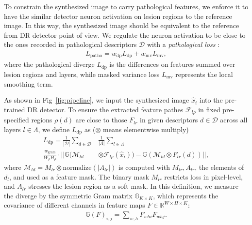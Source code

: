 \documentclass[letterpaper]{article} %
\begin{document}
   To constrain the synthesized image to carry pathological features, we enforce it to have the similar detector neuron activation on lesion regions to the reference image. In this way, the synthesized image should be equivalent to the reference from DR detector point of view. We regulate the neuron activation to be close to the ones recorded in pathological descriptors $ \mathcal{D} $ with a  \emph{pathological loss} :
    \begin{align}
	\label{align_patho_loss} 
	L_\mathrm{patho} = w_\mathrm{dp} L_\mathrm{dp} + w_\mathrm{mv} L_\mathrm{mv},
	\end{align}
	where the pathological diverge $L_\mathrm{dp}$ is the differences on features summed over lesion regions and layers, while masked variance loss $L_\mathrm{mv}$ represents the local smoothing term. 
    
    As shown in  Fig~\ref{fig:pipeline}, we input the synthesized image $ \hat x_i $ into the pre-trained DR detector.
    To ensure the extracted feature pathes $ \mathcal{F}_{l\rho} $ in fixed pre-specified regions $ \rho(d) $ are close to those $ F_{lr} $ in given descriptors $ d \in \mathcal{D} $ across all layers $ l \in \Lambda $, we define $ L_\mathrm{dp}$ as ($ \otimes $ means elementwise multiply)
    \begin{align}
    \label{align_dp_loss} \textstyle
    L_\mathrm{dp} = \frac{1}{|\mathcal{D}|} \sum_{d\in \mathcal{D}} &\textstyle \frac{1}{|\Lambda|} \sum_{l \in \Lambda}\nonumber \\ \textstyle \frac{w_\mathrm{gram}}{W_\rho H_\rho} \cdot 
    || \mathbb{G}(\mathcal{M}_{ld}& \otimes  \mathcal{F}_{l\rho}(\hat x_i)) 
    - \mathbb{G}(\mathcal{M}_{ld} \otimes F_{lr}(d)) ||,
    \end{align}
	where $ \mathcal{M}_{ld} = M_{lr} \otimes \mathrm{normalize}(|A_{lr}|) $ is computed with $ M_{lr}, A_{lr}$, the elements of $ d_l $, and used as a feature mask. The binary mask $ M_{lr} $ restricts loss in pixel-level, and $ A_{lr} $ stresses the lesion region as a soft mask.
	In this definition, we measure the diverge by the symmetric Gram matrix $ \mathbb{G}_{K\times K} $, which represents the covariance of different channels in feature maps $ F \in \mathbb{R}^{W\times H\times K}$:
	\begin{align}
	\label{align_gram} \textstyle
	\mathbb{G}(F)_{i, j} = \sum_{w,h} F_{whi}F_{whj}.
	\end{align}
	
\end{document}
